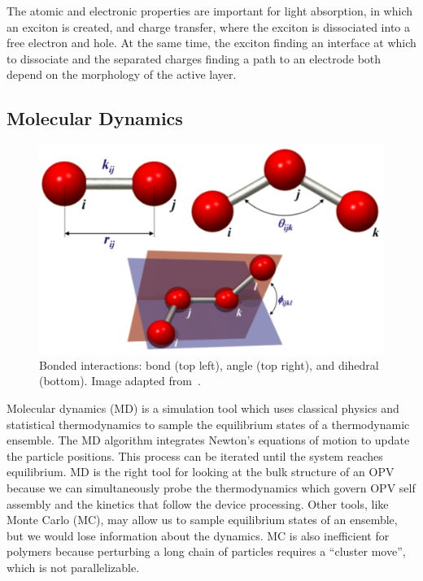 The atomic and electronic properties are important for light absorption, in which an exciton is created, and charge transfer, where the exciton is dissociated into a free electron and hole\cite{Scharber2006a,Hoppe2004,Mazzio2015}.
At the same time, the exciton finding an interface at which to dissociate and the separated charges finding a path to an electrode both depend on the morphology of the active layer.
\subsection*{Molecular Dynamics}

\begin{figure}
    \centering
    \includegraphics[width=\linewidth]{images/bondangledihedral.pdf}
    \caption{Bonded interactions: bond (top left), angle (top right), and dihedral (bottom). Image adapted from~\cite{punma}.}\label{bad}
\end{figure}
Molecular dynamics (MD) is a simulation tool which uses classical physics and statistical thermodynamics to sample the equilibrium states of a thermodynamic ensemble.
The MD algorithm integrates Newton's equations of motion to update the particle positions.
This process can be iterated until the system reaches equilibrium.
MD is the right tool for looking at the bulk structure of an OPV because we can simultaneously probe the thermodynamics which govern OPV self assembly and the kinetics that follow the device processing.
Other tools, like Monte Carlo (MC), may allow us to sample equilibrium states of an ensemble, but we would lose information about the dynamics.
MC is also inefficient for polymers because perturbing a long chain of particles requires a ``cluster move'', which is not parallelizable.

